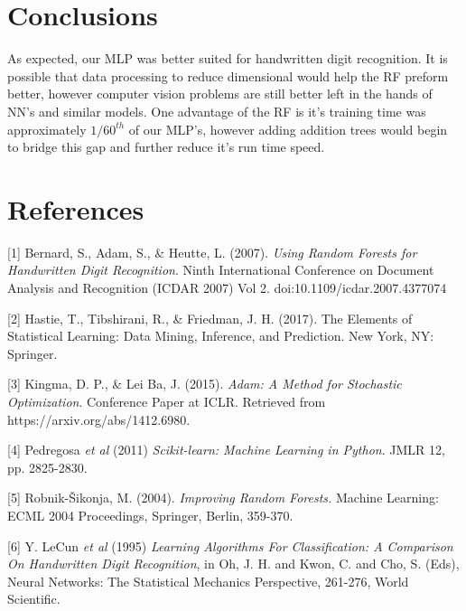 \documentclass{article}
\begin{document}
\section{Conclusions}
As expected, our MLP was better suited for handwritten digit recognition. It is possible that data processing to reduce dimensional would help the RF preform better, however computer vision problems are still better left in the hands of NN's and similar models. One advantage of the RF is it's training time was approximately $1/60^{th}$ of our MLP's, however adding addition trees would begin to bridge this gap and further reduce it's run time speed. 

\clearpage

\section*{References}
\medskip

\small

[1] Bernard, S., Adam, S., & Heutte, L. (2007). \textit{Using Random Forests for Handwritten Digit Recognition}. Ninth International Conference on Document Analysis and Recognition (ICDAR 2007) Vol 2. doi:10.1109/icdar.2007.4377074

[2] Hastie, T., Tibshirani, R., & Friedman, J. H. (2017). The Elements of Statistical Learning: Data Mining, Inference, and Prediction. New York, NY: Springer.

[3] Kingma, D. P., & Lei Ba, J. (2015). 
\textit{Adam: A Method for Stochastic Optimization}. Conference Paper at ICLR. Retrieved from https://arxiv.org/abs/1412.6980.

[4] Pedregosa \textit{et al} (2011) \textit{Scikit-learn: Machine Learning in Python}. JMLR 12, pp. 2825-2830.

[5] Robnik-Šikonja, M. (2004). \textit{Improving Random Forests.} Machine Learning: ECML 2004 Proceedings, Springer, Berlin, 359-370.

[6] Y. LeCun \textit{et al} (1995) \textit{Learning Algorithms For Classification: A Comparison On Handwritten Digit Recognition}, in Oh, J. H. and Kwon, C. and Cho, S. (Eds), Neural Networks: The Statistical Mechanics Perspective, 261-276, World Scientific.
\end{document}
